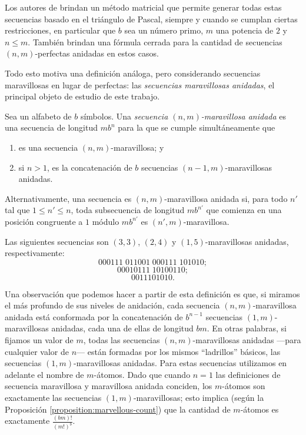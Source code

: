 Los autores de \cite{becher-nested-perfect} brindan un método matricial que
permite generar todas estas secuencias basado en el triángulo
de Pascal, siempre y cuando se cumplan ciertas restricciones,
en particular que $b$ sea un número primo, $m$ una potencia de $2$ y $n \leq m$.
También brindan una fórmula cerrada para la cantidad de secuencias
$(n,m)$-perfectas anidadas en estos casos.

Todo esto motiva una definición análoga, pero considerando secuencias
maravillosas en lugar de perfectas: las \emph{secuencias maravillosas anidadas},
el principal objeto de estudio de este trabajo.

\begin{definition}
	Sea un alfabeto de $b$ símbolos.
	Una \emph{secuencia $(n,m)$-maravillosa anidada} es una secuencia de
	longitud $m b^n$ para la que se cumple simultáneamente que
	\begin{enumerate}
		\item es una secuencia $(n,m)$-maravillosa; y
		\item si $n > 1$, es la concatenación de $b$ secuencias
		      $(n-1,m)$-maravillosas anidadas.
	\end{enumerate}

	Alternativamente, una secuencia es $(n,m)$-maravillosa anidada si, para todo
	$n'$ tal que $1 \leq n' \leq n$, toda subsecuencia de longitud
	$m b^{n'}$ que comienza en una posición congruente a $1$ módulo
	$m b^{n'}$ es $(n',m)$-maravillosa.
\end{definition}

\begin{examples}
	Las siguientes secuencias son $(3,3)$, $(2,4)$ y $(1,5)$-maravillosas anidadas,
	respectivamente:
	\[ 000111\;011001\;000111\;101010; \]
	\[ 00010111\;10100110; \]
	\[ 0011101010. \]
\end{examples}

Una observación que podemos hacer a partir de esta definición es que, si miramos
el más profundo de sus niveles de anidación, cada secuencia $(n,m)$-maravillosa
anidada está conformada por la concatenación de $b^{n-1}$ secuencias
$(1,m)$-maravillosas anidadas, cada una de ellas de longitud $bm$. En otras
palabras, si fijamos un valor de $m$, todas las secuencias $(n,m)$-maravillosas
anidadas ---para cualquier valor de $n$--- están formadas por los mismos
``ladrillos'' básicos, las secuencias $(1,m)$-maravillosas anidadas. Para estas
secuencias utilizamos en adelante el nombre de $m$-átomos. Dado que cuando
$n = 1$ las definiciones de secuencia maravillosa y maravillosa anidada
conciden, los $m$-átomos son exactamente las secuencias $(1,m)$-maravillosas;
esto implica (según la Proposición \ref{proposition:marvellous-count})
que la cantidad de $m$-átomos es exactamente $\frac{(bm)!}{(m!)^b}$.

